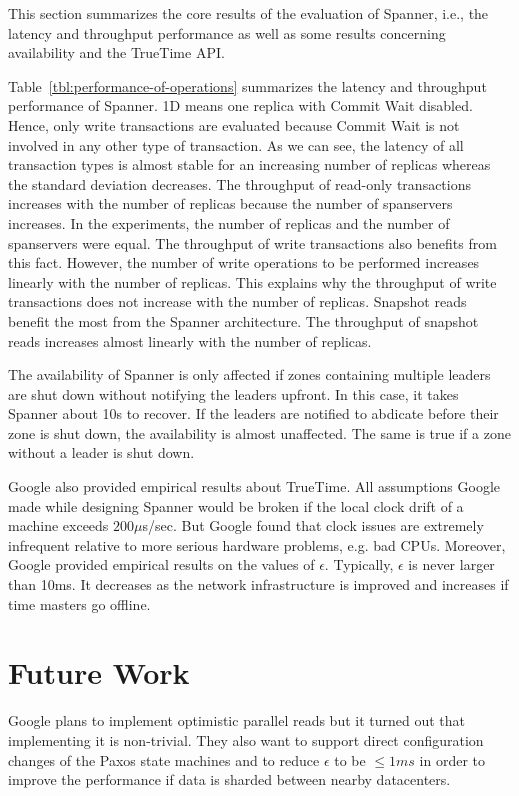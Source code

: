 \documentclass[onecolumn, a4paper, 10pt]{article}
\begin{document}
This section summarizes the core results of the evaluation of Spanner, i.e., the
latency and throughput performance as well as some results concerning availability
and the TrueTime API.

Table~\ref{tbl:performance-of-operations} summarizes the latency and throughput
performance of Spanner. 1D means one replica with Commit Wait disabled. Hence,
only write transactions are evaluated because Commit Wait is not involved in any
other type of transaction. As we can see, the latency of all transaction types is
almost stable for an increasing number of replicas whereas the standard deviation
decreases. The throughput of read-only transactions increases with the number of
replicas because the number of spanservers increases. In the experiments, the
number of replicas and the number of spanservers were equal. The throughput of
write transactions also benefits from this fact. However, the number of write
operations to be performed increases linearly with the number of replicas. This
explains why the throughput of write transactions does not increase with the
number of replicas. Snapshot reads benefit the most from the Spanner architecture.
The throughput of snapshot reads increases almost linearly with the number of
replicas.

The availability of Spanner is only affected if zones containing multiple leaders
are shut down without notifying the leaders upfront. In this case, it takes Spanner
about 10s to recover. If the leaders are notified to abdicate before their zone
is shut down, the availability is almost unaffected. The same is true if a zone
without a leader is shut down.

Google also provided empirical results about TrueTime. All assumptions Google
made while designing Spanner would be broken if the local clock drift of a machine
exceeds $200\mu$s/sec. But Google found that clock issues are extremely infrequent
relative to more serious hardware problems, e.g. bad CPUs. Moreover, Google
provided empirical results on the values of $\epsilon$. Typically, $\epsilon$ is
never larger than 10ms. It decreases as the network infrastructure is improved
and increases if time masters go offline.

\section{Future Work}
\label{sec:future-work}

Google plans to implement optimistic parallel reads but it turned out that
implementing it is non-trivial. They also want to support direct configuration
changes of the Paxos state machines and to reduce $\epsilon$ to be $\leq 1ms$ in
order to improve the performance if data is sharded between nearby datacenters.
\end{document}
